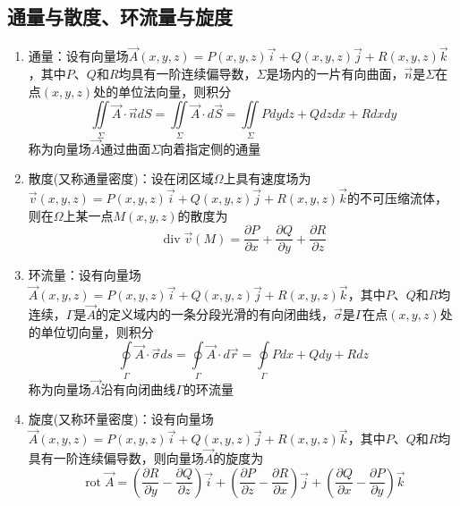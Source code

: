 \documentclass[12pt,a4paper,UTF8]{book}
\begin{document}
\subsection{通量与散度、环流量与旋度}
\begin{enumerate}
\item 通量：设有向量场$\vec{A}\left(x,y,z\right)=P\left(x,y,z\right)\vec{i}+Q\left(x,y,z\right)\vec{j}+R\left(x,y,z\right)\vec{k}$，其中$P$、$Q$和$R$均具有一阶连续偏导数，$\Sigma$是场内的一片有向曲面，$\vec{n}$是$\Sigma$在点$\left(x,y,z\right)$处的单位法向量，则积分
\[\iint\limits_{\Sigma}\vec{A}\cdot\vec{n}dS=\iint\limits_{\Sigma}\vec{A}\cdot d\vec{S}=\iint\limits_{\Sigma}Pdydz+Qdzdx+Rdxdy\]
称为向量场$\vec{A}$通过曲面$\Sigma$向着指定侧的通量
\item 散度(又称通量密度)：设在闭区域$\Omega$上具有速度场为$\vec{v}\left(x,y,z\right)=P\left(x,y,z\right)\vec{i}+Q\left(x,y,z\right)\vec{j}+R\left(x,y,z\right)\vec{k}$的不可压缩流体，则在$\Omega$上某一点$M\left(x,y,z\right)$的散度为
\[\operatorname{div}\vec{v}\left(M\right)=\frac{\partial P}{\partial x}+\frac{\partial Q}{\partial y}+\frac{\partial R}{\partial z}\]
\item 环流量：设有向量场$\vec{A}\left(x,y,z\right)=P\left(x,y,z\right)\vec{i}+Q\left(x,y,z\right)\vec{j}+R\left(x,y,z\right)\vec{k}$，其中$P$、$Q$和$R$均连续，$\Gamma$是$\vec{A}$的定义域内的一条分段光滑的有向闭曲线，$\vec{\sigma}$是$\Gamma$在点$\left(x,y,z\right)$处的单位切向量，则积分
\[\oint\limits_{\Gamma}\vec{A}\cdot\vec{\sigma}ds=\oint\limits_{\Gamma}\vec{A}\cdot d\vec{r}=\oint\limits_{\Gamma}Pdx+Qdy+Rdz\]
称为向量场$\vec{A}$沿有向闭曲线$\Gamma$的环流量
\item 旋度(又称环量密度)：设有向量场$\vec{A}\left(x,y,z\right)=P\left(x,y,z\right)\vec{i}+Q\left(x,y,z\right)\vec{j}+R\left(x,y,z\right)\vec{k}$，其中$P$、$Q$和$R$均具有一阶连续偏导数，则向量场$\vec{A}$的旋度为
\[\operatorname{rot}\vec{A}=\left(\frac{\partial R}{\partial y}-\frac{\partial Q}{\partial z}\right)\vec{i}+\left(\frac{\partial P}{\partial z}-\frac{\partial R}{\partial x}\right)\vec{j}+\left(\frac{\partial Q}{\partial x}-\frac{\partial P}{\partial y}\right)\vec{k}\]
\end{enumerate}
\end{document}
